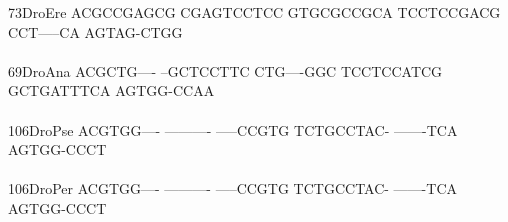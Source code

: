 \documentclass[11pt,twoside,reqno,a4paper]{article}
\begin{document}
{73\hspace*{2\charwidth}DroEre	ACGCCGAGCG	CGAGTCCTCC	GTGCGCCGCA	TCCTCCGACG	CCT-----CA	AGTAG-CTGG	\\
\hspace*{4\charwidth}\hspace*{7\charwidth}\hspace*{1\charwidth}\hspace*{1\charwidth}\hspace*{1\charwidth}\hspace*{1\charwidth}\hspace*{1\charwidth}\hspace*{1\charwidth}\\
69\hspace*{2\charwidth}DroAna	ACGCTG----	--GCTCCTTC	CTG----GGC	TCCTCCATCG	GCTGATTTCA	AGTGG-CCAA	\\
\hspace*{4\charwidth}\hspace*{7\charwidth}\hspace*{1\charwidth}\hspace*{1\charwidth}\hspace*{1\charwidth}\hspace*{1\charwidth}\hspace*{1\charwidth}\hspace*{1\charwidth}\\
106\hspace*{1\charwidth}DroPse	ACGTGG----	----------	-----CCGTG	TCTGCCTAC-	-------TCA	AGTGG-CCCT	\\
\hspace*{4\charwidth}\hspace*{7\charwidth}\hspace*{1\charwidth}\hspace*{1\charwidth}\hspace*{1\charwidth}\hspace*{1\charwidth}\hspace*{1\charwidth}\hspace*{1\charwidth}\\
106\hspace*{1\charwidth}DroPer	ACGTGG----	----------	-----CCGTG	TCTGCCTAC-	-------TCA	AGTGG-CCCT	\\
\hspace*{4\charwidth}\hspace*{7\charwidth}\hspace*{1\charwidth}\hspace*{1\charwidth}\hspace*{1\charwidth}\hspace*{1\charwidth}\hspace*{1\charwidth}\hspace*{1\charwidth}\\
}
\end{document}
